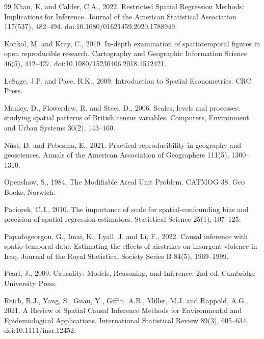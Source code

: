 \documentclass{article}
\begin{document}
\begin{thebibliography}{99}
Khan, K. and Calder, C.A., 2022. Restricted Spatial Regression Methods: Implications for Inference. Journal of the American Statistical Association 117(537), 482--494. doi:10.1080/01621459.2020.1788949.

Konkol, M. and Kray, C., 2019. In-depth examination of spatiotemporal figures in open reproducible research. Cartography and Geographic Information Science 46(5), 412--427. doi:10.1080/15230406.2018.1512421.

LeSage, J.P. and Pace, R.K., 2009. Introduction to Spatial Econometrics. CRC Press.

Manley, D., Flowerdew, R. and Steel, D., 2006. Scales, levels and processes: studying spatial patterns of British census variables. Computers, Environment and Urban Systems 30(2), 143--160.

N\"ust, D. and Pebesma, E., 2021. Practical reproducibility in geography and geosciences. Annals of the American Association of Geographers 111(5), 1300--1310.

Openshaw, S., 1984. The Modifiable Areal Unit Problem. CATMOG 38, Geo Books, Norwich.

Paciorek, C.J., 2010. The importance of scale for spatial-confounding bias and precision of spatial regression estimators. Statistical Science 25(1), 107--125.

Papadogeorgou, G., Imai, K., Lyall, J. and Li, F., 2022. Causal inference with spatio-temporal data: Estimating the effects of airstrikes on insurgent violence in Iraq. Journal of the Royal Statistical Society Series B 84(5), 1969--1999.

Pearl, J., 2009. Causality: Models, Reasoning, and Inference. 2nd ed. Cambridge University Press.

Reich, B.J., Yang, S., Guan, Y., Giffin, A.B., Miller, M.J. and Rappold, A.G., 2021. A Review of Spatial Causal Inference Methods for Environmental and Epidemiological Applications. International Statistical Review 89(3), 605--634. doi:10.1111/insr.12452.


\end{thebibliography}
\end{document}
